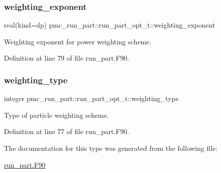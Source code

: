 \subsubsection{\texorpdfstring{weighting\+\_\+exponent}{weighting\_exponent}}
{\footnotesize\ttfamily real(kind=dp) pmc\+\_\+run\+\_\+part\+::run\+\_\+part\+\_\+opt\+\_\+t\+::weighting\+\_\+exponent}



Weighting exponent for power weighting scheme. 



Definition at line 79 of file run\+\_\+part.\+F90.

\mbox{\label{structpmc__run__part_1_1run__part__opt__t_a7a73aba29b76062f29c5be56207eeb51}} 
\subsubsection{\texorpdfstring{weighting\+\_\+type}{weighting\_type}}
{\footnotesize\ttfamily integer pmc\+\_\+run\+\_\+part\+::run\+\_\+part\+\_\+opt\+\_\+t\+::weighting\+\_\+type}



Type of particle weighting scheme. 



Definition at line 77 of file run\+\_\+part.\+F90.



The documentation for this type was generated from the following file\+:\begin{DoxyCompactItemize}
\item 
\mbox{\hyperlink{run__part_8_f90}{run\+\_\+part.\+F90}}\end{DoxyCompactItemize}
